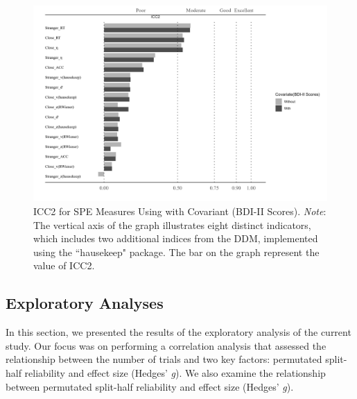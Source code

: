 \documentclass[sn-apa]{sn-jnl}%
\theoremstyle{thmstyleone}%
\theoremstyle{thmstyletwo}%
\theoremstyle{thmstylethree}%
\begin{document}
\begin{figure}[!ht]
	\centering
	\includegraphics[width=1.1\textwidth]{./Figure/Fig5_BDI_cov.png}
	\caption[ICC2 for SPE Measures Using \textcite{hu2023data} with Covariant (BDI-II Scores)]{ICC2 for SPE Measures Using \textcite{hu2023data} with Covariant (BDI-II Scores).  \textit{Note}: The vertical axis of the graph illustrates eight distinct indicators, which includes two additional indices from the DDM, implemented using the ``hausekeep" package. The bar on the graph represent the value of ICC2.
	}\label{fig:BDI_cov_Result}
\end{figure}


\subsection{Exploratory Analyses}\label{sec:Exploratory}

In this section, we presented the results of the exploratory analysis of the current study. Our focus was on performing a correlation analysis that assessed the relationship between the number of trials and two key factors: permutated split-half reliability and effect size (Hedges’ \textit{g}). We also examine the relationship between permutated split-half reliability and effect size (Hedges’ \textit{g}).
\end{document}
